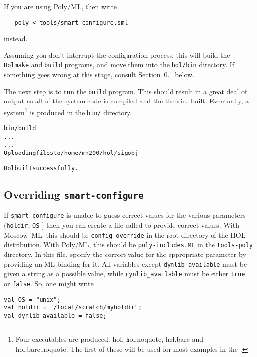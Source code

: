 If you are using Poly/ML, then write
\begin{verbatim}
   poly < tools/smart-configure.sml
\end{verbatim}
instead.

Assuming you don't interrupt the configuration process, this will
build the \texttt{Holmake} and \texttt{build} programs, and move them
into the \texttt{hol/bin} directory.  If something goes wrong at this
stage, consult Section~\ref{sec:editting-configure} below.

The next step is to run the \texttt{build} program.  This should
result in a great deal of output as all of the system code is compiled
and the theories built.  Eventually, a \HOL{} system\footnote{Four
  \HOL{} executables are produced: \textsf{hol}, \textsf{hol.noquote},
  \textsf{hol.bare} and \textsf{hol.bare.noquote}.  The first of these
  will be used for most examples in the \TUTORIAL{}.} is produced in
the \texttt{bin/} directory.

\begin{session}
\begin{alltt}
\dol bin/build
  ...
  ...
Uploading files to /home/mn200/hol/sigobj

Hol built successfully.
\dol
\end{alltt}
\end{session}


\subsection{Overriding \texttt{smart-configure}}
\label{sec:editting-configure}

If \texttt{smart-configure} is unable to guess correct values for the
various parameters (\texttt{holdir}, \texttt{OS} \etc) then you can
create a file called to provide correct values.  With Moscow~ML, this
should be \texttt{config-override} in the root directory of the HOL
distribution.  With Poly/ML, this should be \texttt{poly-includes.ML}
in the \texttt{tools-poly} directory. In this file, specify the
correct value for the appropriate parameter by providing an ML binding
for it.  All variables except \texttt{dynlib\_available} must be given
a string as a possible value, while \texttt{dynlib\_available} must be
either \texttt{true} or \texttt{false}.  So, one might write

\begin{session}
\begin{verbatim}
val OS = "unix";
val holdir = "/local/scratch/myholdir";
val dynlib_available = false;
\end{verbatim}
\end{session}

